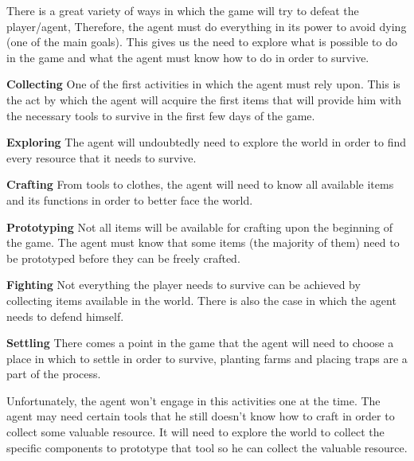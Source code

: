 There is a great variety of ways in which the game will try to defeat the player/agent, Therefore, the agent must do everything in its power to avoid dying (one of the main goals).
This gives us the need to explore what is possible to do in the game and what the agent must know how to do in order to survive.

\begin{description}
	\item \textbf{Collecting} One of the first activities in which the agent must rely upon.
This is the act by which the agent will acquire the first items that will provide him with the necessary tools to survive in the first few days of the game.
	\item \textbf{Exploring} The agent will undoubtedly need to explore the world in order to find every resource that it needs to survive.
	\item \textbf{Crafting} From tools to clothes, the agent will need to know all available items and its functions in order to better face the world.
	\item \textbf{Prototyping} Not all items will be available for crafting upon the beginning of the game.
The agent must know that some items (the majority of them) need to be prototyped before they can be freely crafted.
	\item \textbf{Fighting} Not everything the player needs to survive can be achieved by collecting items available in the world.
There is also the case in which the agent needs to defend himself.
	\item \textbf{Settling} There comes a point in the game that the agent will need to choose a place in which to settle in order to survive, planting farms and placing traps are a part of the process.
\end{description}

Unfortunately, the agent won’t engage in this activities one at the time.
The agent may need certain tools that he still doesn’t know how to craft in order to collect some valuable resource.
It will need to explore the world to collect the specific components to prototype that tool so he can collect the valuable resource.
